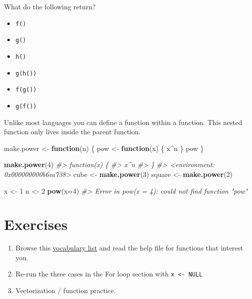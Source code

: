 \documentclass[]{book}
\newenvironment{Shaded}{\begin{snugshade}}{\end{snugshade}}
\newcommand{\KeywordTok}[1]{\textcolor[rgb]{0.13,0.29,0.53}{\textbf{#1}}}
\newcommand{\DataTypeTok}[1]{\textcolor[rgb]{0.13,0.29,0.53}{#1}}
\newcommand{\DecValTok}[1]{\textcolor[rgb]{0.00,0.00,0.81}{#1}}
\newcommand{\StringTok}[1]{\textcolor[rgb]{0.31,0.60,0.02}{#1}}
\newcommand{\CommentTok}[1]{\textcolor[rgb]{0.56,0.35,0.01}{\textit{#1}}}
\newcommand{\ControlFlowTok}[1]{\textcolor[rgb]{0.13,0.29,0.53}{\textbf{#1}}}
\newcommand{\OperatorTok}[1]{\textcolor[rgb]{0.81,0.36,0.00}{\textbf{#1}}}
\newcommand{\NormalTok}[1]{#1}
\providecommand{\tightlist}{%
  \setlength{\itemsep}{0pt}\setlength{\parskip}{0pt}}
\theoremstyle{definition}
\theoremstyle{definition}
\theoremstyle{definition}
\theoremstyle{remark}
\begin{document}
What do the following return?

\begin{itemize}
\tightlist
\item
  \texttt{f()}
\item
  \texttt{g()}
\item
  \texttt{h()}
\item
  \texttt{g(h())}
\item
  \texttt{f(g())}
\item
  \texttt{g(f())}
\end{itemize}

Unlike most languages you can define a function within a function. This
nested function only lives inside the parent function.

\begin{Shaded}
\begin{Highlighting}[]
\NormalTok{make.power <-}\StringTok{ }\ControlFlowTok{function}\NormalTok{(n) \{}
\NormalTok{  pow <-}\StringTok{ }\ControlFlowTok{function}\NormalTok{(x) \{}
\NormalTok{    x}\OperatorTok{^}\NormalTok{n }
\NormalTok{  \}}
\NormalTok{  pow}
\NormalTok{\}}

\KeywordTok{make.power}\NormalTok{(}\DecValTok{4}\NormalTok{)}
\CommentTok{#> function(x) \{}
\CommentTok{#>     x^n }
\CommentTok{#>   \}}
\CommentTok{#> <environment: 0x000000000b6ea738>}
\NormalTok{cube <-}\StringTok{ }\KeywordTok{make.power}\NormalTok{(}\DecValTok{3}\NormalTok{)}
\NormalTok{square <-}\StringTok{ }\KeywordTok{make.power}\NormalTok{(}\DecValTok{2}\NormalTok{)}

\NormalTok{x <-}\StringTok{ }\DecValTok{1}
\NormalTok{n <-}\StringTok{ }\DecValTok{2}
\KeywordTok{pow}\NormalTok{(}\DataTypeTok{x=}\DecValTok{4}\NormalTok{)}
\CommentTok{#> Error in pow(x = 4): could not find function "pow"}
\end{Highlighting}
\end{Shaded}

\section{Exercises}\label{exercises-1}

\begin{enumerate}
\def\labelenumi{\arabic{enumi}.}
\tightlist
\item
  Browse this \href{http://adv-r.had.co.nz/Vocabulary.html}{vocabulary
  list} and read the help file for functions that interest you.
\item
  Re-run the three cases in the For loop section with
  \texttt{x\ \textless{}-\ NULL}
\item
  Vectorization / function practice.
\end{enumerate}
\end{document}
